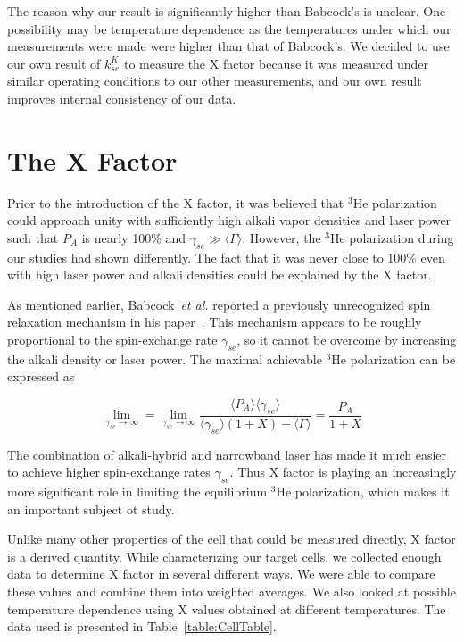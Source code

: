 The reason why our result is significantly higher than Babcock's is unclear. One possibility may be temperature dependence as the temperatures under which our measurements were made were higher than that of Babcock's. We decided to use our own result of $k_{se}^{K}$ to measure the X factor because it was measured under similar operating conditions to our other measurements, and our own result improves internal consistency of our data.

\section{The X Factor}

Prior to the introduction of the X factor, it was believed that $^{3}$He polarization could approach unity with sufficiently high alkali vapor densities and laser power such that $P_{A}$ is nearly 100\% and $\gamma_{se} \gg \langle \Gamma \rangle$. However, the $^{3}$He polarization during our studies had shown differently. The fact that it was never close to 100\% even with high laser power and alkali densities could be explained by the X factor.

As mentioned earlier, Babcock~\emph{et al.} reported a previously unrecognized spin relaxation mechanism in his paper~\cite{PhysRevLett.96.083003}. This mechanism appears to be roughly proportional to the spin-exchange rate $\gamma_{se}$, so it cannot be overcome by increasing the alkali density or laser power. The maximal achievable $^{3}$He polarization can be expressed as

\begin{equation}
\lim_{\gamma_{se}\to\infty}=\lim_{\gamma_{se}\to\infty}\frac{\langle P_{A}\rangle\langle \gamma_{se}\rangle}{\langle\gamma_{se}\rangle(1+X)+\langle\Gamma\rangle}=\frac{P_{A}}{1+X}
\end{equation}

The combination of alkali-hybrid and narrowband laser has made it much easier to achieve higher spin-exchange rates $\gamma_{se}$. Thus X factor is playing an increasingly more significant role in limiting the equilibrium $^{3}$He polarization, which makes it an important subject ot study.

Unlike many other properties of the cell that could be measured directly, X factor is a derived quantity. While characterizing our target cells, we collected enough data to determine X factor in several different ways. We were able to compare these values and combine them into weighted averages. We also looked at possible temperature dependence using X values obtained at different temperatures. The data used is presented in Table~\ref{table:CellTable}.

